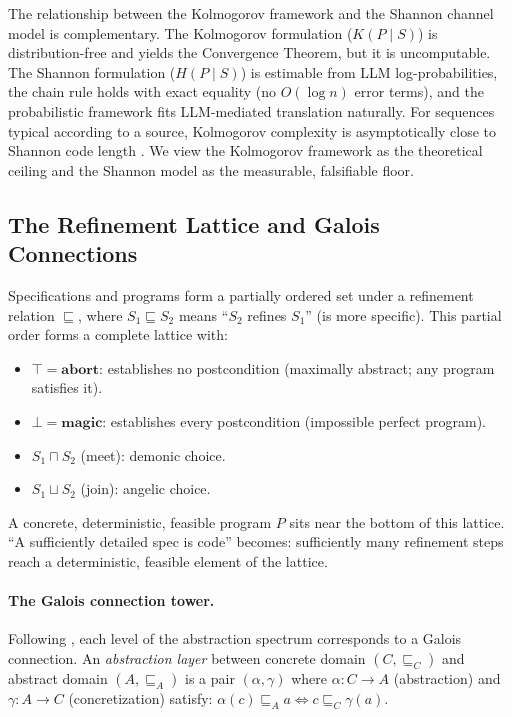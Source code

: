 The relationship between the Kolmogorov framework and the Shannon channel model is complementary. The Kolmogorov formulation ($K(P \mid S)$) is distribution-free and yields the Convergence Theorem, but it is uncomputable. The Shannon formulation ($H(P \mid S)$) is estimable from LLM log-probabilities, the chain rule holds with exact equality (no $O(\log n)$ error terms), and the probabilistic framework fits LLM-mediated translation naturally. For sequences typical according to a source, Kolmogorov complexity is asymptotically close to Shannon code length \citep{vitanyi2004shannon}. We view the Kolmogorov framework as the theoretical ceiling and the Shannon model as the measurable, falsifiable floor.

\subsection{The Refinement Lattice and Galois Connections}

Specifications and programs form a partially ordered set under a refinement relation $\sqsubseteq$, where $S_1 \sqsubseteq S_2$ means ``$S_2$ refines $S_1$'' (is more specific). This partial order forms a complete lattice \citep{back1980correctness, morgan1994programming} with:

\begin{itemize}[nosep]
    \item $\top = \mathbf{abort}$: establishes no postcondition (maximally abstract; any program satisfies it).
    \item $\bot = \mathbf{magic}$: establishes every postcondition (impossible perfect program).
    \item $S_1 \sqcap S_2$ (meet): demonic choice.
    \item $S_1 \sqcup S_2$ (join): angelic choice.
\end{itemize}

A concrete, deterministic, feasible program $P$ sits near the bottom of this lattice. ``A sufficiently detailed spec is code'' becomes: sufficiently many refinement steps reach a deterministic, feasible element of the lattice.

\paragraph{The Galois connection tower.} Following \citet{cousot1977abstract}, each level of the abstraction spectrum corresponds to a Galois connection. An \emph{abstraction layer} between concrete domain $(C, \sqsubseteq_C)$ and abstract domain $(A, \sqsubseteq_A)$ is a pair $(\alpha, \gamma)$ where $\alpha: C \to A$ (abstraction) and $\gamma: A \to C$ (concretization) satisfy: $\alpha(c) \sqsubseteq_A a \iff c \sqsubseteq_C \gamma(a)$.


